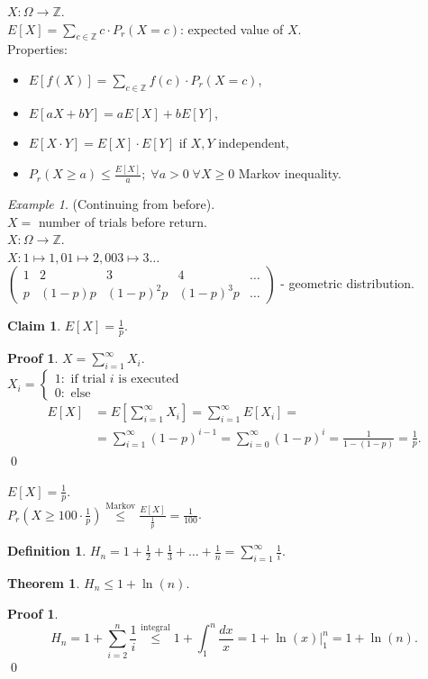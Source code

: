 \documentclass[a4paper, 12pt]{book}
\newcommand*\Eval[3]{\left.#1\right\rvert_{#2}^{#3}}
\theoremstyle{definition}
\newtheorem{defn}[counter]{Definition}
\newtheorem{claim}[counter]{Claim}
\newtheorem{theorem}[counter]{Theorem}
\newtheorem{pro}[counter]{Proof}
\theoremstyle{remark}
\newtheorem*{ex}{Example}
\newcommand{\Z}{\mathbb{Z}}
\begin{document}
$X: \Omega \to \Z$. \\
$E[X] = \sum_{c \in \Z} c \cdot P_r(X = c)$: expected value of $X$. \\
Properties:
\begin{itemize}[label=$\circ$]
  \item $E[f(X)] = \sum_{c \in \Z} f(c) \cdot P_r(X = c)$,
  \item $E[aX + bY] = aE[X] + bE[Y]$,
  \item $E[X \cdot Y] = E[X] \cdot E[Y]$ if $X, Y$ independent,
  \item $P_r(X \geq a) \leq \frac{E[X]}{a}; \; \forall a > 0 \; \forall X \geq 0$ Markov inequality.
\end{itemize}
\begin{ex}
  (Continuing from before). \\
  $X =$ number of trials before return. \\
  $X: \Omega \to \Z$. \\
  $X: 1 \mapsto 1, 01 \mapsto 2, 003 \mapsto 3 \dots$ \\
  $\begin{pmatrix}
    1 & 2 & 3 & 4 & \dots \\
    p & (1-p)p & (1-p)^2 p & (1-p)^3p & \dots
  \end{pmatrix}$ - geometric distribution.
\end{ex}
\begin{claim}
  $E[X] = \frac{1}{p}$.
\end{claim}
\begin{pro}
  $X = \sum_{i=1}^{\infty} X_i$. \\
  $X_i = \begin{cases}
    1: \text{ if trial $i$ is executed} \\
    0: \text{ else}
  \end{cases}$ \\
  \begin{align*}
    E[X] &= E\left[\sum_{i=1}^{\infty} X_i\right] = \sum_{i=1}^{\infty} E[X_i] = \\
    &= \sum_{i=1}^{\infty} (1-p)^{i-1} = \sum_{i=0}^{\infty} (1-p)^i = \frac{1}{1-(1-p)} = \frac{1}{p}.
  \end{align*}
  \qed
\end{pro}
$E[X] = \frac{1}{p}$. \\
$P_r(X \geq 100 \cdot \frac{1}{p}) \stackrel{\text{Markov}}{\leq} \frac{E[X]}{\frac{1}{p}} = \frac{1}{100}$.
\begin{defn}
  $H_n = 1 + \frac{1}{2} + \frac{1}{3} + \dots + \frac{1}{n} = \sum_{i=1}^{\infty} \frac{1}{i}$.
\end{defn}
\begin{theorem}
  $H_n \leq 1 + \ln(n)$.
\end{theorem}
\begin{pro}
  \begin{equation*}
    H_n = 1 + \sum_{i=2}^{n} \frac{1}{i} \stackrel{\text{integral}}{\leq}
    1 + \int_{1}^{n} \frac{dx}{x} = 1 + \Eval{\ln(x)}{1}{n} = 1 + \ln(n).
  \end{equation*}
  \qed
\end{pro}
\end{document}

